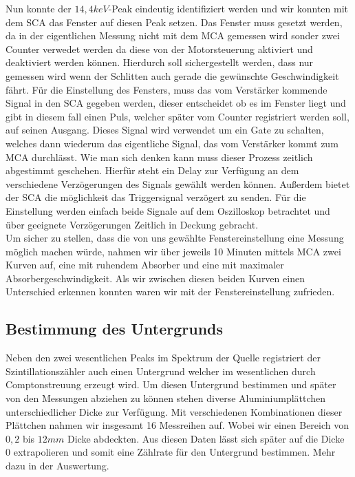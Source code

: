 \documentclass[12pt]{article}
\begin{document}
Nun konnte der $14,4keV$-Peak eindeutig identifiziert werden und wir konnten mit dem SCA das Fenster auf diesen Peak setzen. Das Fenster muss gesetzt werden, da in der eigentlichen
Messung nicht mit dem MCA gemessen wird sonder zwei Counter verwedet werden da diese von der Motorsteuerung aktiviert und deaktiviert werden können. Hierdurch soll sichergestellt werden,
dass nur gemessen wird wenn der Schlitten auch gerade die gewünschte Geschwindigkeit fährt. Für die Einstellung des Fensters, muss das vom Verstärker kommende Signal in den SCA gegeben
werden, dieser entscheidet ob es im Fenster liegt und gibt in diesem fall einen Puls, welcher später vom Counter registriert werden soll, auf seinen Ausgang. Dieses Signal wird verwendet
um ein Gate zu schalten, welches dann wiederum das eigentliche Signal, das vom Verstärker kommt zum MCA durchlässt. Wie man sich denken kann muss dieser Prozess zeitlich abgestimmt
geschehen. Hierfür steht ein Delay zur Verfügung an dem verschiedene Verzögerungen des Signals gewählt werden können. Außerdem bietet der SCA die möglichkeit das Triggersignal verzögert
zu senden. Für die Einstellung werden einfach beide Signale auf dem Oszilloskop betrachtet und über geeignete Verzögerungen Zeitlich in Deckung gebracht.\\

Um sicher zu stellen, dass die von uns gewählte Fenstereinstellung eine Messung möglich machen würde, nahmen wir über jeweils 10 Minuten mittels MCA zwei Kurven auf, eine mit
ruhendem Absorber und eine mit maximaler Absorbergeschwindigkeit. Als wir zwischen diesen beiden Kurven einen Unterschied erkennen konnten waren wir mit der Fenstereinstellung zufrieden.

\subsection{Bestimmung des Untergrunds}
Neben den zwei wesentlichen Peaks im Spektrum der Quelle registriert der Szintillationszähler auch einen Untergrund welcher im wesentlichen durch Comptonstreuung erzeugt wird. Um diesen
Untergrund bestimmen und später von den Messungen abziehen zu können stehen diverse Aluminiumplättchen unterschiedlicher Dicke zur Verfügung. Mit verschiedenen Kombinationen dieser Plättchen nahmen wir
insgesamt 16 Messreihen auf. Wobei wir einen Bereich von $0,2$ bis $12 mm$ Dicke abdeckten. Aus diesen Daten lässt sich später auf die Dicke 0 extrapolieren und somit eine Zählrate für
den Untergrund bestimmen. Mehr dazu in der Auswertung.
\end{document}
